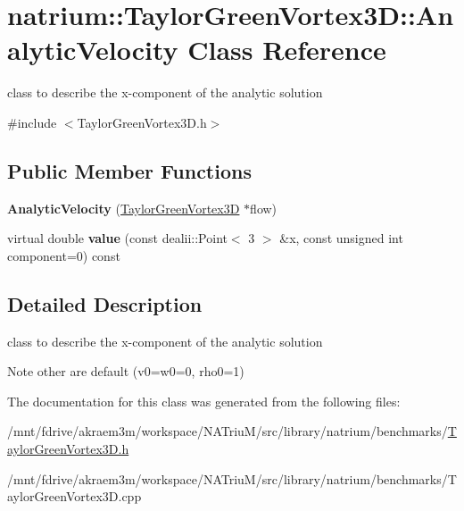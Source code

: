 \hypertarget{classnatrium_1_1TaylorGreenVortex3D_1_1AnalyticVelocity}{
\section{natrium::TaylorGreenVortex3D::AnalyticVelocity Class Reference}
\label{classnatrium_1_1TaylorGreenVortex3D_1_1AnalyticVelocity}
}


class to describe the x-\/component of the analytic solution  


{\ttfamily \#include $<$TaylorGreenVortex3D.h$>$}\subsection*{Public Member Functions}
\begin{DoxyCompactItemize}
\item 
\hypertarget{classnatrium_1_1TaylorGreenVortex3D_1_1AnalyticVelocity_af4b477d878e6b5074d8f6f679ff209bf}{
{\bfseries AnalyticVelocity} (\hyperlink{classnatrium_1_1TaylorGreenVortex3D}{TaylorGreenVortex3D} $\ast$flow)}
\label{classnatrium_1_1TaylorGreenVortex3D_1_1AnalyticVelocity_af4b477d878e6b5074d8f6f679ff209bf}

\item 
\hypertarget{classnatrium_1_1TaylorGreenVortex3D_1_1AnalyticVelocity_aee87e33a5958b703389634499031f841}{
virtual double {\bfseries value} (const dealii::Point$<$ 3 $>$ \&x, const unsigned int component=0) const }
\label{classnatrium_1_1TaylorGreenVortex3D_1_1AnalyticVelocity_aee87e33a5958b703389634499031f841}

\end{DoxyCompactItemize}


\subsection{Detailed Description}
class to describe the x-\/component of the analytic solution \begin{DoxyNote}{Note}
other are default (v0=w0=0, rho0=1) 
\end{DoxyNote}


The documentation for this class was generated from the following files:\begin{DoxyCompactItemize}
\item 
/mnt/fdrive/akraem3m/workspace/NATriuM/src/library/natrium/benchmarks/\hyperlink{TaylorGreenVortex3D_8h}{TaylorGreenVortex3D.h}\item 
/mnt/fdrive/akraem3m/workspace/NATriuM/src/library/natrium/benchmarks/TaylorGreenVortex3D.cpp\end{DoxyCompactItemize}
